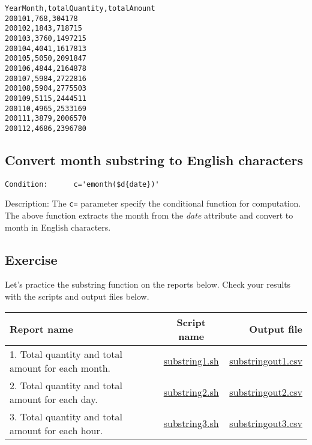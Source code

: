 \begin{verbatim}
YearMonth,totalQuantity,totalAmount
200101,768,304178
200102,1843,718715
200103,3760,1497215
200104,4041,1617813
200105,5050,2091847
200106,4844,2164878
200107,5984,2722816
200108,5904,2775503
200109,5115,2444511
200110,4965,2533169
200111,3879,2006570
200112,4686,2396780

\end{verbatim}

\subsection{Convert month substring to English characters }

\begin{verbatim}
Condition:		c='emonth($d{date})'
\end{verbatim}

\noindent Description: 		The \verb|c=| parameter specify the conditional function for computation. 
The above function extracts the month from the \emph{date} attribute and convert to month
 in English characters. \\


\subsection{Exercise }

Let's practice the substring function on the reports below. Check your results with the scripts and output files below. 

\begin{table}[htbp]
{\small
\begin{tabular}{ l | c || r }
\hline
\textbf{Report name}   & \textbf{Script name} & \textbf{Output file}  \\
\hline
1. Total quantity and total amount for each month. & \href{exercise/substring1.sh}{substring1.sh} & \href{exercise/outdat/substringout1.csv}{substringout1.csv} \\
2. Total quantity and total amount for each day. & \href{exercise/substring2.sh}{substring2.sh} & \href{exercise/outdat/substringout2.csv}{substringout2.csv} \\
3. Total quantity and total amount for each hour. & \href{exercise/substring3.sh}{substring3.sh} & \href{exercise/outdat/substringout3.csv}{substringout3.csv} \\

\hline
\end{tabular} 
}
\end{table} 


%
